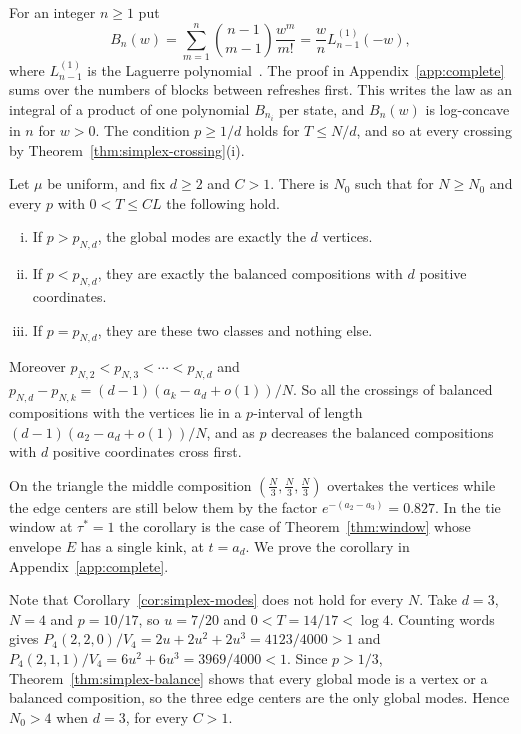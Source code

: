 For an integer $n\ge1$ put
\begin{equation}\label{eq:refresh-polynomial}
B_n(w)=\sum_{m=1}^n\binom{n-1}{m-1}\frac{w^m}{m!}
=\frac wn L^{(1)}_{n-1}(-w),
\end{equation}
where $L^{(1)}_{n-1}$ is the Laguerre polynomial~\cite[Eq.~18.5.12]{dlmf}. The proof
in Appendix~\ref{app:complete} sums over the numbers of blocks between refreshes first. This writes the law as an
integral of a product of one polynomial $B_{n_i}$ per state, and $B_n(w)$ is log-concave in $n$
for $w>0$. The condition
$p\ge1/d$ holds for $T\le N/d$, and so at every crossing by
Theorem~\ref{thm:simplex-crossing}(i).

\begin{corollary}\label{cor:simplex-modes}
Let $\mu$ be uniform, and fix $d\ge2$ and $C>1$. There is $N_0$ such that for $N\ge N_0$ and
every $p$ with $0<T\le CL$ the following hold.
\begin{enumerate}[(i)]
\item If $p>p_{N,d}$, the global modes are exactly the $d$ vertices.
\item If $p<p_{N,d}$, they are exactly the balanced compositions with $d$ positive
coordinates.
\item If $p=p_{N,d}$, they are these two classes and nothing else.
\end{enumerate}
Moreover $p_{N,2}<p_{N,3}<\cdots<p_{N,d}$ and
$p_{N,d}-p_{N,k}=(d-1)(a_k-a_d+o(1))/N$. So all the crossings of balanced compositions with the
vertices lie in a $p$-interval of length $(d-1)(a_2-a_d+o(1))/N$, and as $p$ decreases the
balanced compositions with $d$ positive coordinates cross first.
\end{corollary}

On the triangle the middle composition
$(\frac N3,\frac N3,\frac N3)$ overtakes the vertices while the edge centers are still
below them by the factor $e^{-(a_2-a_3)}=0.827$.
In the tie window at $\tau^*=1$ the corollary is the case of Theorem~\ref{thm:window} whose envelope
$E$ has a single kink, at $t=a_d$. We prove the corollary in Appendix~\ref{app:complete}.

\begin{remark}\label{rem:simplex-edge-mode}
Note that Corollary~\ref{cor:simplex-modes} does not hold for every $N$. Take $d=3$, $N=4$ and
$p=10/17$, so $u=7/20$ and $0<T=14/17<\log4$. Counting words gives
$P_4(2,2,0)/V_4=2u+2u^2+2u^3=4123/4000>1$ and $P_4(2,1,1)/V_4=6u^2+6u^3=3969/4000<1$.
Since $p>1/3$, Theorem~\ref{thm:simplex-balance} shows that every global mode is a vertex or
a balanced composition, so the three edge centers are the only global modes. Hence $N_0>4$
when $d=3$, for every $C>1$.
\end{remark}


